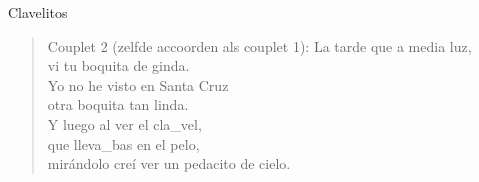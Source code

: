 \begin{song}[vals]{Clavelitos}
\begin{verse}{Couplet 2 (zelfde accoorden als couplet 1):}
La tarde que a media luz,\\
vi tu boquita de ginda.\\
Yo no he visto en Santa Cruz\\
otra boquita tan linda. \hspace{1em} \hspace{1em} \hspace{1em}\\
Y luego al ver el cla\_vel,\\
\hspace{1em} que lleva\_bas  \hspace{1em} en el pelo, \hspace{1em} \hspace{1em} \hspace{1em}\\
mirándolo creí  \hspace{1em}ver
un pedacito de cielo.
\end{verse}
\end{song}

